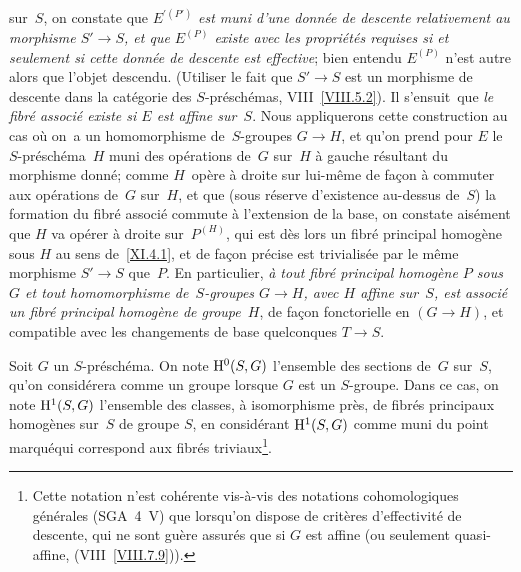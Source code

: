 sur~$S$, on constate que $E^{\prime(P')}$ \emph{est muni d'une donnée
de descente relativement au morphisme $S'\to S$, et que $E^{(P)}$
existe avec les propriétés requises si et seulement si cette
donnée de descente est effective}; bien entendu $E^{(P)}$ n'est
autre alors que l'objet descendu. (Utiliser le fait que $S'\to S$ est
un morphisme de descente dans la cat\'egorie des
$S$-pr\'esch\'emas, \cf VIII~\ref{VIII.5.2}). Il s'ensuit~que
\emph{le fibré associé existe si $E$ est affine sur~$S$}. Nous
appliquerons cette construction au cas o\`u on~a un homomorphisme de~$S$-groupes $G\to H$, et qu'on prend pour $E$ le $S$-pr\'esch\'ema~$H$ muni des op\'erations de~$G$ sur~$H$ \`a gauche r\'esultant
du morphisme donn\'e; comme $H$~op\`ere \`a droite sur
lui-m\^eme de fa\c con \`a commuter aux op\'erations de~$G$
sur~$H$, et que (sous r\'eserve d'existence au-dessus de~$S$) la
formation du fibr\'e associ\'e commute \`a l'extension de la
base, on constate ais\'ement que $H$ va op\'erer \`a droite sur~$P^{(H)}$, qui est d\`es lors un fibr\'e principal homog\`ene
sous $H$ au sens de~\ref{XI.4.1}, et
de fa\c con pr\'ecise est trivialis\'ee par le m\^eme
morphisme $S'\to S$ que~$P$. En particulier, \emph{à tout
fibré principal homogène $P$ sous $G$ et tout homomorphisme de~$S$-groupes $G\to H$, avec $H$ affine sur~$S$, est associé un
fibré principal homogène de groupe~$H$}, de fa\c con
fonctorielle en $(G\to H)$, et compatible avec les changements de base
quelconques $T\to S$.

\begin{definition}
\label{XI.4.4}
Soit $G$ un $S$-pr\'esch\'ema. On note $\mathrm{H}^0(S,G)$ l'ensemble des
sections de~$G$ sur~$S$, qu'on consid\'erera comme un groupe lorsque
$G$ est un $S$-groupe. Dans ce cas, on note $\mathrm{H}^1(S,G)$ l'ensemble des
classes, \`a isomorphisme pr\`es, de fibr\'es principaux
homog\`enes sur~$S$ de groupe $S$, en consid\'erant $\mathrm{H}^1(S,G)$
comme muni du \og point marqu\'e\fg qui correspond aux fibr\'es
triviaux\footnote{\label{note-296}Cette notation n'est coh\'erente
vis-\`a-vis
des notations cohomologiques g\'en\'erales (SGA~4~V)
que lorsqu'on dispose de crit\`eres d'effectivit\'e de descente,
qui ne sont gu\`ere assur\'es que si $G$ est affine (ou seulement
quasi-affine, \cf (VIII~\ref{VIII.7.9})).}.
\end{definition}

